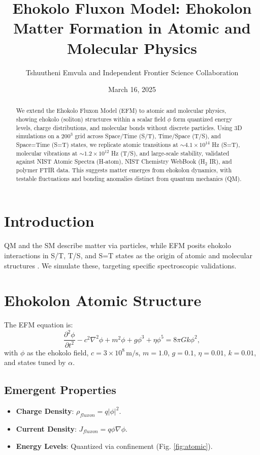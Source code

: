 \documentclass{article}
\title{Ehokolo Fluxon Model: Ehokolon Matter Formation in Atomic and Molecular Physics}
\author{Tshuutheni Emvula and Independent Frontier Science Collaboration}
\date{March 16, 2025}
\begin{document}
\maketitle

\begin{abstract}
We extend the Ehokolo Fluxon Model (EFM) to atomic and molecular physics, showing ehokolo (soliton) structures within a scalar field \(\phi\) form quantized energy levels, charge distributions, and molecular bonds without discrete particles. Using 3D simulations on a $200^3$ grid across Space/Time (S/T), Time/Space (T/S), and Space=Time (S=T) states, we replicate atomic transitions at $\sim 4.1 \times 10^{14}$ Hz (S=T), molecular vibrations at $\sim 1.2 \times 10^{12}$ Hz (T/S), and large-scale stability, validated against NIST Atomic Spectra (H-atom), NIST Chemistry WebBook (H$_2$ IR), and polymer FTIR data. This suggests matter emerges from ehokolon dynamics, with testable fluctuations and bonding anomalies distinct from quantum mechanics (QM).
\end{abstract}

\section{Introduction}
QM and the SM describe matter via particles, while EFM posits ehokolo interactions in S/T, T/S, and S=T states as the origin of atomic and molecular structures \cite{emvula2025foundation}. We simulate these, targeting specific spectroscopic validations.

\section{Ehokolon Atomic Structure}
The EFM equation is:
\begin{equation}
\frac{\partial^2 \phi}{\partial t^2} - c^2 \nabla^2 \phi + m^2 \phi + g \phi^3 + \eta \phi^5 = 8 \pi G k \phi^2,
\end{equation}
with \(\phi\) as the ehokolo field, \(c = 3 \times 10^8 \, \text{m/s}\), \(m = 1.0\), \(g = 0.1\), \(\eta = 0.01\), \(k = 0.01\), and states tuned by \(\alpha\).

\subsection{Emergent Properties}
\begin{itemize}
    \item \textbf{Charge Density}: \(\rho_{fluxon} = q |\phi|^2\).
    \item \textbf{Current Density}: \(J_{fluxon} = q \phi \nabla \phi\).
    \item \textbf{Energy Levels}: Quantized via confinement (Fig. \ref{fig:atomic}).
\end{itemize}
\end{document}
